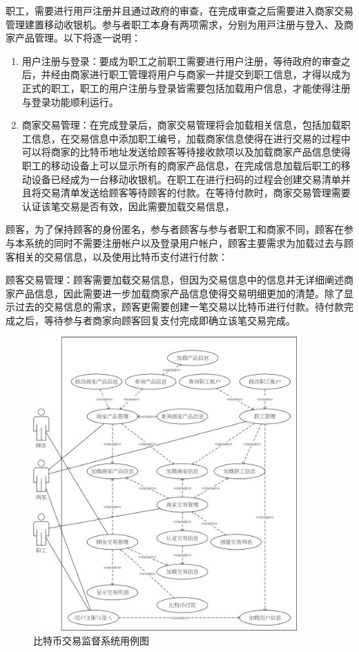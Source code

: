 职⼯，需要进⾏⽤⼾注册并且通过政府的审查，在完成审查之后需要进⼊商家交易管理建置移动收银机。参与者职⼯本⾝有两项需求，分别为⽤⼾注册与登⼊、及商家产品管理。以下将逐⼀说明：


	\begin{enumerate}
	\item 用户注册与登录：要成为职工之前职工需要进行用户注册，等待政府的审查之后，并经由商家进行职工管理将用户与商家一并提交到职工信息，才得以成为正式的职工，职工的用户注册与登录皆需要包括加载用户信息，才能使得注册与登录功能顺利运行。
	\item 商家交易管理：在完成登录后，商家交易管理将会加载相关信息，包括加载职工信息，在交易信息中添加职工编号，加载商家信息使得在进行交易的过程中可以将商家的比特币地址发送给顾客等待接收款项以及加载商家产品信息使得职工的移动设备上可以显示所有的商家产品信息，在完成信息加载后职工的移动设备已经成为一台移动收银机。在职工在进行扫码的过程会创建交易清单并且将交易清单发送给顾客等待顾客的付款。在等待付款时，商家交易管理需要认证该笔交易是否有效，因此需要加载交易信息，
	\end{enumerate}

顾客，为了保持顾客的身份匿名，参与者顾客与参与者职工和商家不同，顾客在参与本系统的同时不需要注册帐户以及登录用户帐户，顾客主要需求为加载过去与顾客相关的交易信息，以及使用比特币支付进行付款：


顾客交易管理：顾客需要加载交易信息，但因为交易信息中的信息并无详细阐述商家产品信息，因此需要进一步加载商家产品信息使得交易明细更加的清楚。除了显示过去的交易信息的需求，顾客更需要创建一笔交易以⽐特币进⾏付款。待付款完成之后，等待参与者商家向顾客回复⽀付完成即确立该笔交易完成。

	\begin{figure}[!htbp]
	\centering
	\includegraphics[width = 0.9\textwidth]{UC.jpg}
	\caption{比特币交易监督系统⽤例图}\label{UC}
	\end{figure}

